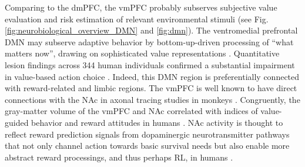 \documentclass[10pt,letterpaper]{article}
\begin{document}
Comparing to the dmPFC,
the vmPFC probably subserves
subjective value evaluation and
risk estimation of relevant environmental stimuli
(see Fig. \ref{fig:neurobiological_overview_DMN} and \ref{fig:dmn}).
The ventromedial prefrontal DMN may
subserve adaptive behavior by bottom-up-driven
processing of “what matters now”,
drawing on sophisticated value representations
\citep{rolls_OFC, doherty2015structure}.
Quantitative lesion findings across 344 human individuals confirmed
a substantial impairment in value-based action choice
\citep{glascher2012lesion}.
Indeed,
this DMN region is preferentially connected with reward-related and limbic regions.
The vmPFC is well known to have direct connections
with the NAc
in axonal tracing studies in monkeys \citep{haber1995orbital}.
Congruently, the gray-matter volume of the vmPFC and NAc
correlated with indices of value-guided behavior and reward attitudes
in humans
\citep{lebreton2009automatic}.
NAc activity is thought to reflect reward prediction signals
from dopaminergic neurotransmitter pathways
\citep{schultz1998predictive}
that not only channel action towards basic survival needs but also
enable more abstract reward processings, and thus perhaps RL,
in humans \citep{doherty2015structure}.
\end{document}
